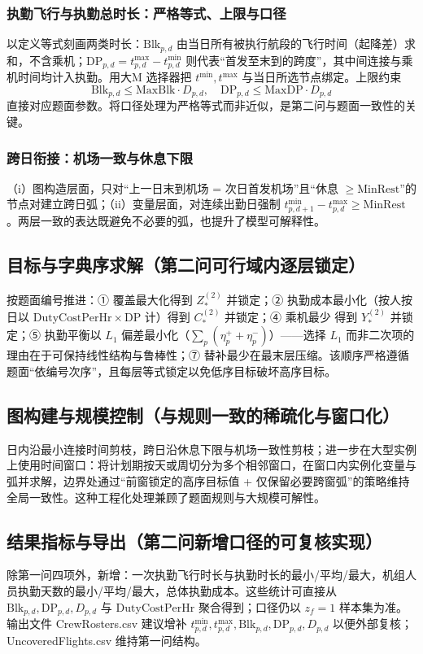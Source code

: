 \documentclass{article}
\begin{document}
\subsubsection{执勤飞行与执勤总时长：严格等式、上限与口径}
以定义等式刻画两类时长：$\mathrm{Blk}_{p,d}$ 由当日所有被执行航段的飞行时间（起降差）求和，不含乘机；$\mathrm{DP}_{p,d}=t^{\max}_{p,d}-t^{\min}_{p,d}$ 则代表“首发至末到的跨度”，其中间连接与乘机时间均计入执勤。用大M 选择器把 $t^{\min}, t^{\max}$ 与当日所选节点绑定。上限约束
\begin{equation}
\mathrm{Blk}_{p,d} \le \mathrm{MaxBlk} \cdot D_{p,d}, \quad \mathrm{DP}_{p,d} \le \mathrm{MaxDP} \cdot D_{p,d}
\end{equation}
直接对应题面参数。将口径处理为严格等式而非近似，是第二问与题面一致性的关键。

\subsubsection{跨日衔接：机场一致与休息下限}
（i）图构造层面，只对“上一日末到机场 = 次日首发机场”且“休息 $\ge \mathrm{MinRest}$”的节点对建立跨日弧；（ii）变量层面，对连续出勤日强制 $t^{\min}_{p,d+1}-t^{\max}_{p,d}\ge \mathrm{MinRest}$。两层一致的表达既避免不必要的弧，也提升了模型可解释性。

\subsection{目标与字典序求解（第二问可行域内逐层锁定）}
按题面编号推进：① 覆盖最大化得到 $Z^{(2)}_*$ 并锁定；② 执勤成本最小化（按人按日以 $\mathrm{DutyCostPerHr} \times \mathrm{DP}$ 计）得到 $C^{(2)}_*$ 并锁定；④ 乘机最少 得到 $Y^{(2)}_*$ 并锁定；⑤ 执勤平衡以 $L_1$ 偏差最小化（$\sum_p(\eta_p^{+}+\eta_p^{-})$）——选择 $L_1$ 而非二次项的理由在于可保持线性结构与鲁棒性；⑦ 替补最少在最末层压缩。该顺序严格遵循题面“依编号次序”，且每层等式锁定以免低序目标破坏高序目标。

\subsection{图构建与规模控制（与规则一致的稀疏化与窗口化）}
日内沿最小连接时间剪枝，跨日沿休息下限与机场一致性剪枝；进一步在大型实例上使用时间窗口：将计划期按天或周切分为多个相邻窗口，在窗口内实例化变量与弧并求解，边界处通过“前窗锁定的高序目标值 + 仅保留必要跨窗弧”的策略维持全局一致性。这种工程化处理兼顾了题面规则与大规模可解性。

\subsection{结果指标与导出（第二问新增口径的可复核实现）}
除第一问四项外，新增：一次执勤飞行时长与执勤时长的最小/平均/最大，机组人员执勤天数的最小/平均/最大，总体执勤成本。这些统计可直接从 $\mathrm{Blk}_{p,d}, \mathrm{DP}_{p,d}, D_{p,d}$ 与 $\mathrm{DutyCostPerHr}$ 聚合得到；口径仍以 $z_f=1$ 样本集为准。输出文件 CrewRosters.csv 建议增补 $t^{\min}_{p,d}, t^{\max}_{p,d}, \mathrm{Blk}_{p,d}, \mathrm{DP}_{p,d}, D_{p,d}$ 以便外部复核；UncoveredFlights.csv 维持第一问结构。
\end{document}
